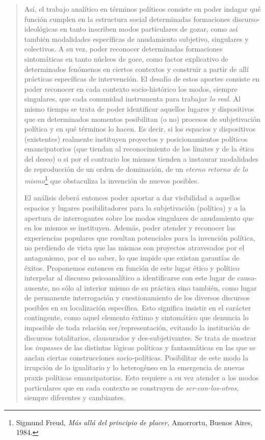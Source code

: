 \begin{quote}
Así, el trabajo analítico en términos políticos consiste en poder indagar qué función cumplen en la estructura social determinadas formaciones discurso-ideológicas en tanto inscriben modos particulares de gozar, como así también modalidades específicas de anudamiento subjetivo, singulares y colectivos. A su vez, poder reconocer determinadas formaciones sintomáticas en tanto núcleos de goce, como factor explicativo de determinados fenómenos en ciertos contextos y construir a partir de allí prácticas específicas de intervención. El desafío de estos aportes consiste en poder reconocer en cada contexto socio-histórico los modos, siempre singulares, que cada comunidad instrumenta para trabajar \emph{lo real.} Al mismo tiempo se trata de poder identificar aquellos lugares y dispositivos que en determinados momentos posibilitan (o no) procesos de subjetivación política y en qué términos lo hacen. Es decir, si los espacios y dispositivos (existentes) realmente instituyen proyectos y posicionamientos políticos emancipatorios (que tiendan al reconocimiento de los límites y de la ética del deseo) o si por el contrario los mismos tienden a instaurar modalidades de reproducción de un orden de dominación, de un \emph{eterno retorno de lo mismo}\footnote{Sigmund Freud, \emph{Más allá del principio de placer,} Amorrortu, Buenos Aires, 1984.} que obstaculiza la invención de nuevos posibles.

El análisis deberá entonces poder aportar a dar visibilidad a aquellos espacios y lugares posibilitadores para la subjetivación (política) y a la apertura de interrogantes sobre los modos singulares de anudamiento que en los mismos se instituyen. Además, poder atender y reconocer las experiencias populares que resultan potenciales para la invención política, no perdiendo de vista que las mismas son proyectos atravesados por el antagonismo, por el no saber, lo que impide que existan garantías de éxitos. Proponemos entonces en función de este lugar ético y político interpelar al discurso psicoanalítico a identificarse con este lugar de causa-ausente, no sólo al interior mismo de su práctica sino también, como lugar de permanente interrogación y cuestionamiento de los diversos discursos posibles en su localización específica. Esto significa insistir en el carácter contingente, como aquel elemento éxtimo y sintomático que denuncia lo imposible de toda relación ser/representación, evitando la institución de discursos totalitarios, clausurados y des-subjetivantes. Se trata de mostrar los \emph{impasses} de las distintas lógicas políticas y fantasmáticas en las que se anclan ciertas construcciones socio-políticas. Posibilitar de este modo la irrupción de lo igualitario y lo heterogéneo en la emergencia de nuevas praxis políticas emancipatorias. Esto requiere a su vez atender a los modos particulares que en cada contexto se construyen de \emph{ser-con-los-otros,} siempre diferentes y cambiantes.


\end{quote}
